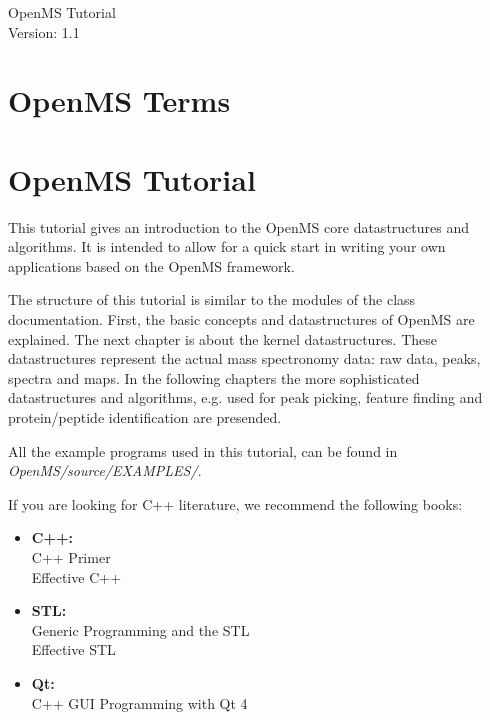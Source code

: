 \documentclass[a4paper]{article}
\begin{document}
\begin{titlepage}
\vspace*{7cm}
\begin{center}
{\Large OpenMS Tutorial\\[1ex]\large Version: 1.1 }\\
\end{center}
\end{titlepage}


\setcounter{tocdepth}{2}
\tableofcontents
\pagebreak

\section{OpenMS Terms}
	
	
	\pagebreak

\section{OpenMS Tutorial}

	This tutorial gives an introduction to the OpenMS core datastructures and algorithms.
	It is intended to allow for a quick start in writing your own applications based on
	the OpenMS framework.
	
	The structure of this tutorial is similar to the modules of the class documentation.
	First, the basic concepts and datastructures of OpenMS are explained. The next chapter is
	about the kernel datastructures. These datastructures represent the actual mass spectronomy
	data: raw data, peaks, spectra and maps. In the following chapters the more sophisticated 
	datastructures and algorithms, e.g. used for peak picking, feature finding and protein/peptide 
	identification are presended.
	
	All the example programs used in this tutorial, can be found in {\em OpenMS/source/EXAMPLES/}.

	If you are looking for C++ literature, we recommend the following books:
	\begin{itemize}
		\item {\bf C++:}\\ C++ Primer\\ Effective C++
		\item {\bf STL:}\\ Generic Programming and the STL\\ Effective STL
		\item {\bf Qt:}\\ C++ GUI Programming with Qt 4
	\end{itemize}
	
	\pagebreak
	
	\pagebreak
	
	\pagebreak
	
	\pagebreak
	
	\pagebreak
	
	\pagebreak
	
	\pagebreak
	
	\pagebreak
	
	\pagebreak
	
	\pagebreak
	
	\pagebreak
	
\end{document}
